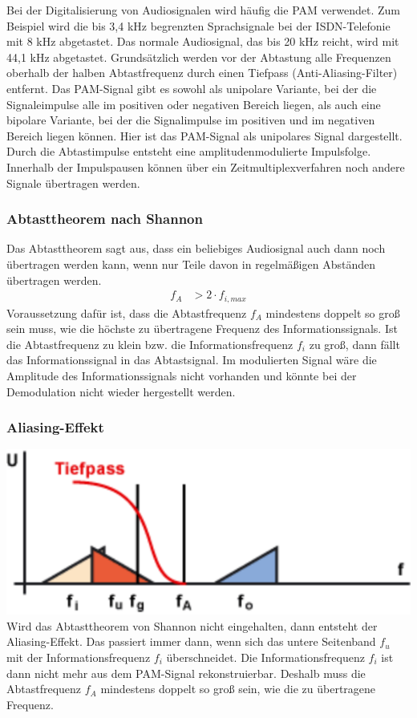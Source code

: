 \documentclass[a4paper,10pt]{article}
\begin{document}
Bei der Digitalisierung von Audiosignalen wird häufig die PAM verwendet. Zum Beispiel wird die bis 3,4 kHz begrenzten Sprachsignale bei der
ISDN-Telefonie mit 8 kHz abgetastet. Das normale Audiosignal, das bis 20 kHz reicht, wird mit 44,1 kHz abgetastet.
Grundsätzlich werden vor der Abtastung alle Frequenzen oberhalb der halben Abtastfrequenz durch einen Tiefpass (Anti-Aliasing-Filter) entfernt. 
Das PAM-Signal gibt es sowohl als unipolare Variante, bei der die Signaleimpulse alle im positiven oder negativen Bereich liegen, als auch eine
bipolare Variante, bei der die Signalimpulse im positiven und im negativen Bereich liegen können. Hier ist das PAM-Signal als unipolares Signal dargestellt.
Durch die Abtastimpulse entsteht eine amplitudenmodulierte Impulsfolge. Innerhalb der Impulspausen können über ein Zeitmultiplexverfahren noch andere Signale übertragen werden.

\subsubsection{Abtasttheorem nach Shannon}
Das Abtasttheorem sagt aus, dass ein beliebiges Audiosignal auch dann noch übertragen werden kann, wenn nur Teile davon in regelmäßigen Abständen übertragen werden.
\begin{align}
 f_A &> 2 \cdot f_{i,max}
\end{align}
Voraussetzung dafür ist, dass die Abtastfrequenz $f_A$ mindestens doppelt so groß sein muss, wie die höchste zu übertragene Frequenz des Informationssignals. 
Ist die Abtastfrequenz zu klein bzw. die Informationsfrequenz $f_i$ zu groß, dann fällt das Informationssignal in das Abtastsignal. Im modulierten Signal 
wäre die Amplitude des Informationssignals nicht vorhanden und könnte bei der Demodulation nicht wieder hergestellt werden.

\subsubsection{Aliasing-Effekt}
\includegraphics[scale=0.5]{Aliasing.png}\\
Wird das Abtasttheorem von Shannon nicht eingehalten, dann entsteht der Aliasing-Effekt. Das passiert immer dann, wenn sich das untere Seitenband $f_u$ mit der Informationsfrequenz 
$f_i$ überschneidet. Die Informationsfrequenz $f_i$ ist dann nicht mehr aus dem PAM-Signal rekonstruierbar. Deshalb muss die Abtastfrequenz $f_A$ mindestens doppelt so groß sein,
wie die zu übertragene Frequenz.
\end{document}
